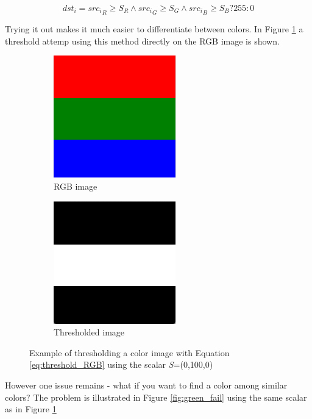 \begin{equation}
{dst_i} = {src_i}_R \geq S_R \wedge {src_i}_G \geq S_G \wedge {src_i}_B \geq S_B? 255: 0
\label{eq:threshold_RGB}
\end{equation}

Trying it out makes it much easier to differentiate between colors. In Figure \ref{fig:RGB_Thresh} a threshold attemp using this method directly on the RGB image is shown.

\begin{figure}
        \centering
        \begin{subfigure}[b]{0.3\textwidth}
                \includegraphics[scale=0.5]{img/RGB}
                \caption{RGB image}
        \end{subfigure}
		\quad
        \begin{subfigure}[b]{0.3\textwidth}
                \includegraphics[scale=0.5]{img/RGBThresh}
                \caption{Thresholded image}
        \end{subfigure}
		\caption{Example of thresholding a color image with Equation \ref{eq:threshold_RGB} using the scalar \textit{S}=(0,100,0)}
		\label{fig:RGB_Thresh}
\end{figure}

However one issue remains - what if you want to find a color among similar colors? The problem is illustrated in Figure \ref{fig:green_fail} using the same scalar as in Figure \ref{fig:RGB_Thresh}

